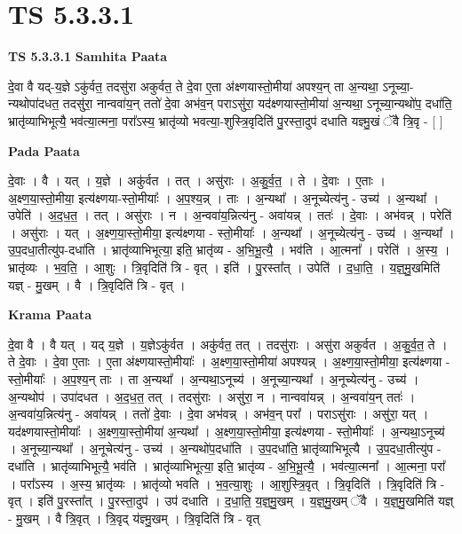 \documentclass[17pt]{extarticle}
\begin{document}
\section{ TS 5.3.3.1 }

\textbf{TS 5.3.3.1 } \newline
\textbf{Samhita Paata} \newline

दे॒वा वै यद्-य॒ज्ञे ऽकु॑र्वत॒ तदसु॑रा अकुर्वत॒ ते दे॒वा ए॒ता अ॑क्ष्णयास्तो॒मीया॑ अपश्य॒न् ता अ॒न्यथा॒ ऽनूच्या॒-न्यथोपा॑दधत॒ तदसु॑रा॒ नान्ववा॑य॒न् ततो॑ दे॒वा अभ॑व॒न् पराऽसु॑रा॒ यद॑क्ष्णयास्तो॒मीया॑ अ॒न्यथा॒ ऽनूच्या॒न्यथो॑प॒ दधा॑ति॒ भ्रातृ॑व्याभिभूत्यै॒ भव॑त्या॒त्मना॒ परा᳚ऽस्य॒ भ्रातृ॑व्यो भवत्या॒-शुस्त्रि॒वृदिति॑ पु॒रस्ता॒दुप॑ दधाति यज्ञ्मु॒खं ॅवै त्रि॒वृ - [  ] \newline

\textbf{Pada Paata} \newline

दे॒वाः । वै । यत् । य॒ज्ञे । अकु॑र्वत । तत् । असु॑राः । अ॒कु॒र्व॒त॒ । ते । दे॒वाः । ए॒ताः । अ॒क्ष्ण॒या॒स्तो॒मीया॒ इत्य॑क्ष्णया-स्तो॒मीयाः᳚ । अ॒प॒श्य॒न्न् । ताः । अ॒न्यथा᳚ । अ॒नूच्येत्य॑नु - उच्य॑ । अ॒न्यथा᳚ । उपेति॑ । अ॒द॒ध॒त॒ । तत् । असु॑राः । न । अ॒न्ववा॑य॒न्नित्य॑नु - अवा॑यन्न् । ततः॑ । दे॒वाः । अभ॑वन्न् । परेति॑ । असु॑राः । यत् । अ॒क्ष्ण॒या॒स्तो॒मीया॒ इत्य॑क्ष्णया - स्तो॒मीयाः᳚ । अ॒न्यथा᳚ । अ॒नूच्येत्य॑नु - उच्य॑ । अ॒न्यथा᳚ । उ॒प॒दधा॒तीत्यु॑प-दधा॑ति । भ्रातृ॑व्याभिभूत्या॒ इति॒ भ्रातृ॑व्य - अ॒भि॒भू॒त्यै॒ । भव॑ति । आ॒त्मना᳚ । परेति॑ । अ॒स्य॒ । भ्रातृ॑व्यः । भ॒व॒ति॒ । आ॒शुः । त्रि॒वृदिति॑ त्रि - वृत् । इति॑ । पु॒रस्ता᳚त् । उपेति॑ । द॒धा॒ति॒ । य॒ज्ञ्॒मु॒खमिति॑ यज्ञ् - मु॒खम् । वै । त्रि॒वृदिति॑ त्रि - वृत् ।  \newline


\textbf{Krama Paata} \newline

दे॒वा वै । वै यत् । यद् य॒ज्ञे । य॒ज्ञेऽकु॑र्वत । अकु॑र्वत॒ तत् । तदसु॑राः । असु॑रा अकुर्वत । अ॒कु॒र्व॒त॒ ते । ते दे॒वाः । दे॒वा ए॒ताः । ए॒ता अ॑क्ष्णयास्तो॒मीयाः᳚ । अ॒क्ष्ण॒या॒स्तो॒मीया॑ अपश्यन्न् । अ॒क्ष्ण॒या॒स्तो॒मीया॒ इत्य॑क्ष्णया - स्तो॒मीयाः᳚ । अ॒प॒श्य॒न् ताः । ता अ॒न्यथा᳚ । अ॒न्यथा॒ऽनूच्य॑ । अ॒नूच्या॒न्यथा᳚ । अ॒नूच्येत्य॑नु - उच्य॑ । अ॒न्यथोप॑ । उपा॑दधत । अ॒द॒ध॒त॒ तत् । तदसु॑राः । असु॑रा॒ न । नान्ववा॑यन्न् । अ॒न्ववा॑य॒न् ततः॑ । अ॒न्ववा॑य॒न्नित्य॑नु - अवा॑यन्न् । ततो॑ दे॒वाः । दे॒वा अभ॑वन्न् । अभ॑व॒न् परा᳚ । पराऽसु॑राः । असु॑रा॒ यत् । यद॑क्ष्णयास्तो॒मीयाः᳚ । अ॒क्ष्ण॒या॒स्तो॒मीया॑ अ॒न्यथा᳚ । अ॒क्ष्ण॒या॒स्तो॒मीया॒ इत्य॑क्ष्णया - स्तो॒मीयाः᳚ । अ॒न्यथा॒ऽनूच्य॑ । अ॒नूच्या॒न्यथा᳚ । अ॒नूचेत्य॑नु - उच्य॑ । अ॒न्यथो॑प॒दधा॑ति । उ॒प॒दधा॑ति॒ भ्रातृ॑व्याभिभूत्यै । उ॒प॒दधा॒तीत्यु॑प - दधा॑ति । भ्रातृ॑व्याभिभूत्यै॒ भव॑ति । भ्रातृ॑व्याभिभूत्या॒ इति॒ भ्रातृ॑व्य - अ॒भि॒भू॒त्यै॒ । भव॑त्या॒त्मना᳚ । आ॒त्मना॒ परा᳚ । परा᳚ऽस्य । अ॒स्य॒ भ्रातृ॑व्यः । भ्रातृ॑व्यो भवति । भ॒व॒त्या॒शुः । आ॒शुस्त्रि॒वृत् । त्रि॒वृदिति॑ । त्रि॒वृदिति॑ त्रि - वृत् । इति॑ पु॒रस्ता᳚त् । पु॒रस्ता॒दुप॑ । उप॑ दधाति । द॒धा॒ति॒ य॒ज्ञ्॒मु॒खम् । य॒ज्ञ्॒मु॒खम् ॅवै । य॒ज्ञ्॒मु॒खमिति॑ यज्ञ् - मु॒खम् । वै त्रि॒वृत् । त्रि॒वृद् य॑ज्ञ्मु॒खम् । त्रि॒वृदिति॑ त्रि - वृत् \newline
\end{document}
